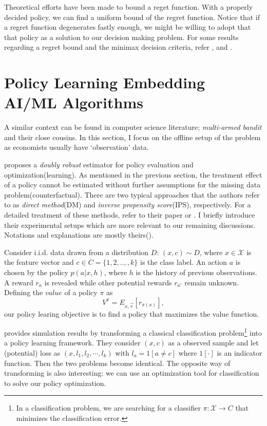 \documentclass[11pt]{article}
\begin{document}
	 Theoretical efforts have been made to bound a reget function. With a properly decided policy, we can find a uniform bound of the regret function. Notice that if a regret function degenerates fastly enough, we might be willing to adopt that that policy as a solution to our decision making problem. For some results regarding a regret bound and the minimax decision criteria, refer \cite{Manski.2004} \cite{Stoye.2009},  and \cite{Hirano.2009}.

	\section{Policy Learning Embedding AI/ML Algorithms}
	A similar context can be found in computer science literature;  \textit{multi-armed bandit} and their close cousins. In this section, I focus on the offline setup of the problem as economists usually have `observation' data.
	
	\cite{Dudik.2011} proposes a \textit{doubly robust} estimator for policy evaluation and optimization(learning). As mentioned in the previous section, the treatment effect of a policy cannot be estimated without further assumptions for the missing data problem(counterfactual). There are two typical approaches that the authors refer to as \textit{direct method}(DM) and \textit{inverse propensity score}(IPS), respectively. For a detailed treatment of these methods, refer to their paper or \cite{imbens2015causal}. I briefly introduce their experimental setups which are more relevant to our remaining discussions. Notations and explanations are mostly theirs(\cite{Dudik.2011}).
	
	Consider i.i.d. data drawn from a distribution $D$: $(x,c) \sim D$, where $x\in \mathcal{X}$ is the feature vector and $c \in C = \{1,2,..,,k\}$ is the class label. An action $a$ is chosen by the policy $p(a|x,h)$, where $h$ is the history of previous observations. A reward $r_a$ is revealed while other potential rewards $r_{a'}$ remain unknown. Defining the $value$ of a policy $\pi$ as
	$$
	V^{\pi} = E_{x, \vec{r}}[r_{\pi(x)}],
	$$
	our policy learing objective is to find a policy that maximizes the value function.
	
	\cite{Dudik.2011} provides simulation results by transforming a classical classification problem\footnote{In a classification problem, we are searching for a classifier  $\pi: \mathcal{X} \rightarrow C$ that minimizes the classification error.} into a policy learning framework. They consider $(x,c)$ as a observed sample and let (potential) loss as $(x,l_1,l_2,\cdots,l_k)$ with $l_a = 1[a\neq c]$ where $1[\cdot]$ is an indicator function. Then the two problems become identical. The opposite way of transforming is also interesting: we can use an optimization tool for classification to solve our policy optimization.
	
\end{document}
